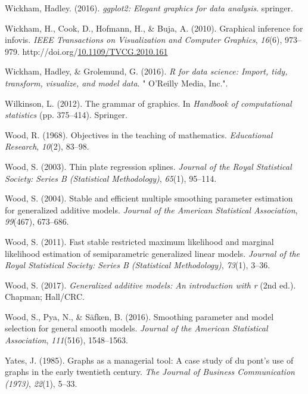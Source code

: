 \documentclass[print]{nuthesis}
\newlength{\cslhangindent}
\newenvironment{CSLReferences}[2]%
{\setlength{\parindent}{0pt}%
\everypar{\setlength{\hangindent}{\cslhangindent}}\ignorespaces}%
{\par}
\begin{document}
\begin{CSLReferences}{1}{0}
\leavevmode{}%
Wickham, Hadley. (2016). \emph{ggplot2: Elegant graphics for data analysis}. springer.

\leavevmode{}%
Wickham, H., Cook, D., Hofmann, H., \& Buja, A. (2010). Graphical inference for infovis. \emph{IEEE Transactions on Visualization and Computer Graphics}, \emph{16}(6), 973--979. http://doi.org/\href{https://doi.org/10.1109/TVCG.2010.161}{10.1109/TVCG.2010.161}

\leavevmode{}%
Wickham, Hadley, \& Grolemund, G. (2016). \emph{R for data science: Import, tidy, transform, visualize, and model data}. " O'Reilly Media, Inc.".

\leavevmode{}%
Wilkinson, L. (2012). The grammar of graphics. In \emph{Handbook of computational statistics} (pp. 375--414). Springer.

\leavevmode{}%
Wood, R. (1968). Objectives in the teaching of mathematics. \emph{Educational Research}, \emph{10}(2), 83--98.

\leavevmode{}%
Wood, S. (2003). Thin plate regression splines. \emph{Journal of the Royal Statistical Society: Series B (Statistical Methodology)}, \emph{65}(1), 95--114.

\leavevmode{}%
Wood, S. (2004). Stable and efficient multiple smoothing parameter estimation for generalized additive models. \emph{Journal of the American Statistical Association}, \emph{99}(467), 673--686.

\leavevmode{}%
Wood, S. (2011). Fast stable restricted maximum likelihood and marginal likelihood estimation of semiparametric generalized linear models. \emph{Journal of the Royal Statistical Society: Series B (Statistical Methodology)}, \emph{73}(1), 3--36.

\leavevmode{}%
Wood, S. (2017). \emph{Generalized additive models: An introduction with r} (2nd ed.). Chapman; Hall/CRC.

\leavevmode{}%
Wood, S., Pya, N., \& Säfken, B. (2016). Smoothing parameter and model selection for general smooth models. \emph{Journal of the American Statistical Association}, \emph{111}(516), 1548--1563.

\leavevmode{}%
Yates, J. (1985). Graphs as a managerial tool: A case study of du pont's use of graphs in the early twentieth century. \emph{The Journal of Business Communication (1973)}, \emph{22}(1), 5--33.

\end{CSLReferences}
\end{document}

